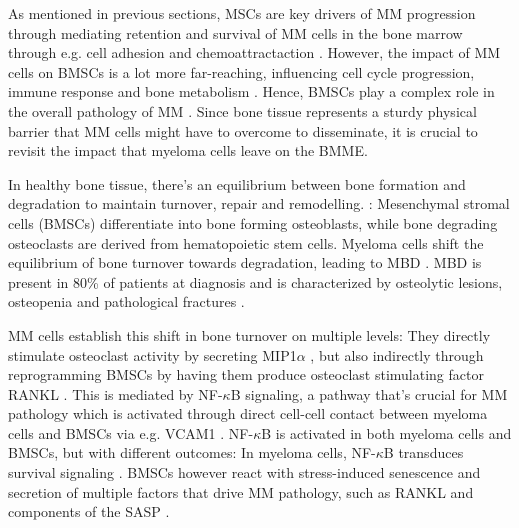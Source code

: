 \label{sec:intro_myeloma_hMSC_interactions}
As mentioned in previous sections, \acp{MSC} are key drivers of \ac{MM}
progression through mediating retention and survival of \ac{MM} cells in the
bone marrow through e.g. cell adhesion and chemoattractaction
\cite{zeissigTumourDisseminationMultiple2020}. However, the impact of \ac{MM}
cells on \acp{BMSC} is a lot more far-reaching, influencing cell cycle
progression, immune response and bone metabolism
\cite{dotterweichContactMyelomaCells2016,
    fernandoTranscriptomeAnalysisMesenchymal2019}. Hence, \acp{BMSC} play a complex
role in the overall pathology of \ac{MM} \cite{mangoliniBoneMarrowStromal2020}.
Since bone tissue represents a sturdy physical barrier that \ac{MM} cells might
have to overcome to disseminate, it is crucial to revisit the impact that
myeloma cells leave on the \ac{BMME}.

In healthy bone tissue, there's an equilibrium between bone formation and
degradation to maintain turnover, repair and remodelling.
\cite{vaananenMechanismBoneTurnover1993}: Mesenchymal stromal cells (BMSCs)
differentiate into bone forming osteoblasts, while bone degrading osteoclasts
are derived from hematopoietic stem cells. Myeloma cells shift the equilibrium
of bone turnover towards degradation, leading to \ac{MBD}
\cite{hideshimaUnderstandingMultipleMyeloma2007}. MBD is present in 80\% of
patients at diagnosis and is characterized by osteolytic lesions, osteopenia and
pathological fractures \cite{terposPathogenesisBoneDisease2018}.


\ac{MM} cells establish this shift in bone turnover on multiple levels: They
directly stimulate osteoclast activity by secreting MIP1$\alpha$
\cite{obaMIP1alphaUtilizesBoth2005}, but also indirectly through reprogramming
\acp{BMSC} by having them produce osteoclast stimulating factor RANKL
\cite{tsubakiHGFMetNFkB2020}. This is mediated by NF-$\kappa$B signaling, a
pathway that's crucial for MM pathology which is activated through direct
cell-cell contact between myeloma cells and \acp{BMSC} via e.g. VCAM1
\cite{cippitelliRoleNFkBSignaling2023, royNFkBActivatingPathways2018}.
NF-$\kappa$B is activated in both myeloma cells and \acp{BMSC}, but with
different outcomes: In myeloma cells, NF-$\kappa$B transduces survival signaling
\cite{royNoncanonicalNFkBMutations2017}. \acp{BMSC} however react with
stress-induced senescence and secretion of multiple factors that drive
\ac{MM} pathology, such as RANKL and components of the \ac{SASP}
\cite{chauhanMultipleMyelomaCell1996, fairfieldMultipleMyelomaCells2020}.


